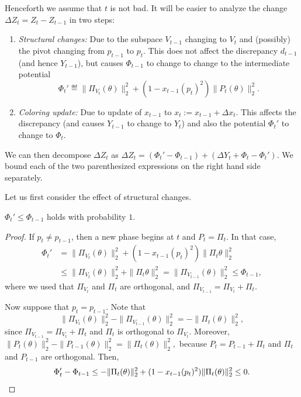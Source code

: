 Henceforth we assume that $t$ is not bad.
It will be easier to analyze the change $\Delta Z_t = Z_t-Z_{t-1}$ in two steps:
\begin{enumerate}
\item \emph{Structural changes:} Due to the subspace $V_{t-1}$ changing to $V_t$ and (possibly) the  pivot changing from $p_{t-1}$ to $p_t$. This does not affect the discrepancy $d_{t-1}$ (and hence $Y_{t-1}$), but causes $\Phi_{t-1}$ to change to change to the intermediate potential
  \[
  \Phi_{t}' \eqdef \|\Pi_{V_{t}}(\theta)\|_2^2 + (1-x_{t-1}(p_t)^2) \|P_{t}(\theta)\|_2^2.
  \]
\item \emph{Coloring update:} Due to update of $x_{t-1}$ to $x_t:= x_{t-1} +\Delta x_t$. This affects the discrepancy (and causes $Y_{t-1}$ to change to $Y_t$) and also the potential  $\Phi_t'$ to change to $\Phi_t$.
\end{enumerate}
We can then decompose $\Delta Z_t$ as
\(
\Delta Z_t = (\Phi_t'- \Phi_{t-1})  + (\Delta Y_t + \Phi_t - \Phi_t').
\)
We bound each of the two parenthesized expressions on the right hand side separately.

Let us first consider the effect of structural changes.
\begin{lemma}\label{lm:gs-subg-struc}
$\Phi_t'\le  \Phi_{t-1}$ holds with probability $1$.
\end{lemma}
\begin{proof}
  If
  $p_t \neq p_{t-1}$, then a new phase begins at $t$ and $P_t= \Pi_t$. 
In that case, 
\begin{align*}
    \Phi_t' &= \|\Pi_{V_{t}}(\theta)\|_2^2 + (1-x_{t-1}(p_t)^2) \|\Pi_{t} \theta\|_2^2  \\%
    &\leq
     \|\Pi_{V_{t}}(\theta)\|_2^2 + \|\Pi_{t} \theta\|_2^2 =  \|\Pi_{V_{t-1}}(\theta)\|_2^2 \le \Phi_{t-1},
\end{align*}
where we used that $\Pi_{V_t}$ and $\Pi_t$ are orthogonal, and $\Pi_{V_{t-1}} = \Pi_{V_t} + \Pi_t$.


Now suppose that $p_t=p_{t-1}$. Note that
\[
  \|\Pi_{V_{t}}(\theta)\|_2^2 - \|\Pi_{V_{t-1}}(\theta)\|_2^2 = -\|\Pi_t(\theta)\|_2^2,
\]
since  $\Pi_{V_{t-1}} = \Pi_{V_{t}} +\Pi_t$ and  $\Pi_t$ is orthogonal to $\Pi_{V_{t}}$. Moreover,
\(
\|P_{t} (\theta)\|_2^2 - \|P_{t-1}(\theta)\|_2^2 = \|\Pi_t(\theta)\|_2^2,
\)
because $P_t = P_{t-1}  + \Pi_t$  and $\Pi_t$ and $P_{t-1}$ are orthogonal. 
Then,
\[
  \Phi_t'- \Phi_{t-1} \le -\|\Pi_t(\theta)\|_2^2 +
                        (1-x_{t-1}(p_t)^2)\|\Pi_t(\theta)\|_2^2  \le 0. \qedhere
\]
\end{proof}

